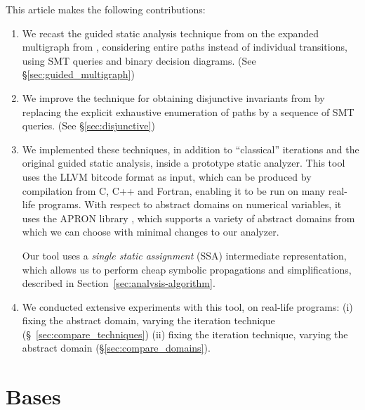 \documentclass[preprint]{sigplanconf}
\begin{document}
This article makes the following contributions:
\begin{enumerate}
\item We recast the guided static analysis technique from \citet{DBLP:conf/sas/GopanR07} on the expanded multigraph from \citet{Monniaux_Gonnord_SAS11}, considering entire paths instead of individual transitions, using SMT queries and binary decision diagrams.\label{contr:guided_multigraph} (See \S\ref{sec:guided_multigraph})
\item We improve the technique for obtaining disjunctive invariants from \citet{DBLP:conf/pldi/GulwaniZ10} by replacing the explicit exhaustive enumeration of paths by a sequence of SMT queries.\label{contr:disjunctive} (See \S\ref{sec:disjunctive})
\item We implemented these techniques, in addition to ``classical'' iterations and the original guided static analysis, inside a prototype static analyzer.
This tool uses the LLVM bitcode format \cite{Lattner:2004:LCF:977395.977673,LLVM_langref} as input, which can be produced by compilation from C, C++ and Fortran, enabling it to be run on many real-life programs.
With respect to abstract domains on numerical variables, it uses the APRON library \cite{DBLP:conf/cav/JeannetM09}, which supports a variety of abstract domains from which we can choose with minimal changes to our analyzer.

Our tool uses a \emph{single static assignment} (SSA) intermediate representation, which allows us to perform cheap symbolic propagations and simplifications,
described in Section~\ref{sec:analysis-algorithm}.

\item We conducted extensive experiments with this tool, on real-life programs: (i) fixing the abstract domain, varying the iteration technique (\S~\ref{sec:compare_techniques}) (ii) fixing the iteration technique, varying the abstract domain (\S\ref{sec:compare_domains}).
\end{enumerate}

\section{Bases}
\end{document}
